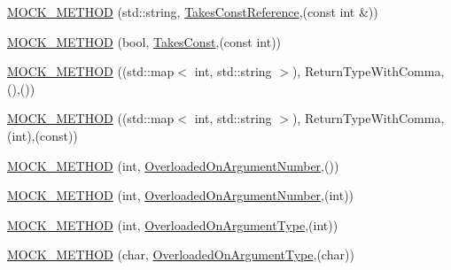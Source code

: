 \begin{DoxyCompactItemize}
\mbox{\hyperlink{classtesting_1_1gmock__function__mocker__test_1_1_mock_foo_a8449bdfea3eaf9fabb34fa694c17ab25}{M\+O\+C\+K\+\_\+\+M\+E\+T\+H\+OD}} (std\+::string, \mbox{\hyperlink{classtesting_1_1gmock__function__mocker__test_1_1_foo_interface_a4765c543c11b5d544a35f9fe8de758bd}{Takes\+Const\+Reference}},(const int \&))
\item 
\mbox{\hyperlink{classtesting_1_1gmock__function__mocker__test_1_1_mock_foo_a68193fcc8b336763c92cb1c8fd7a97ea}{M\+O\+C\+K\+\_\+\+M\+E\+T\+H\+OD}} (bool, \mbox{\hyperlink{classtesting_1_1gmock__function__mocker__test_1_1_foo_interface_abb43737fd2eeb7599b6f0af540890f50}{Takes\+Const}},(const int))
\item 
\mbox{\hyperlink{classtesting_1_1gmock__function__mocker__test_1_1_mock_foo_a8fdcae66e6f4efa07a57580235ca3323}{M\+O\+C\+K\+\_\+\+M\+E\+T\+H\+OD}} ((std\+::map$<$ int, std\+::string $>$), Return\+Type\+With\+Comma,(),())
\item 
\mbox{\hyperlink{classtesting_1_1gmock__function__mocker__test_1_1_mock_foo_adfb6a040264fc42059f0b47e3f21e2df}{M\+O\+C\+K\+\_\+\+M\+E\+T\+H\+OD}} ((std\+::map$<$ int, std\+::string $>$), Return\+Type\+With\+Comma,(int),(const))
\item 
\mbox{\hyperlink{classtesting_1_1gmock__function__mocker__test_1_1_mock_foo_ae7564f6d942087d67512b521fb355f94}{M\+O\+C\+K\+\_\+\+M\+E\+T\+H\+OD}} (int, \mbox{\hyperlink{classtesting_1_1gmock__function__mocker__test_1_1_foo_interface_ae27d00da9698493b196d0913dd5b6c1a}{Overloaded\+On\+Argument\+Number}},())
\item 
\mbox{\hyperlink{classtesting_1_1gmock__function__mocker__test_1_1_mock_foo_ab859902d52f376112fa8c8d5ca402d8a}{M\+O\+C\+K\+\_\+\+M\+E\+T\+H\+OD}} (int, \mbox{\hyperlink{classtesting_1_1gmock__function__mocker__test_1_1_foo_interface_ae27d00da9698493b196d0913dd5b6c1a}{Overloaded\+On\+Argument\+Number}},(int))
\item 
\mbox{\hyperlink{classtesting_1_1gmock__function__mocker__test_1_1_mock_foo_a6c4bc14602957c662e9ace719cf0fd96}{M\+O\+C\+K\+\_\+\+M\+E\+T\+H\+OD}} (int, \mbox{\hyperlink{classtesting_1_1gmock__function__mocker__test_1_1_foo_interface_a78fc84ae56ba53a36047f0791d03fc58}{Overloaded\+On\+Argument\+Type}},(int))
\item 
\mbox{\hyperlink{classtesting_1_1gmock__function__mocker__test_1_1_mock_foo_ae7680c58ebcf5f91c5f190043528b313}{M\+O\+C\+K\+\_\+\+M\+E\+T\+H\+OD}} (char, \mbox{\hyperlink{classtesting_1_1gmock__function__mocker__test_1_1_foo_interface_a78fc84ae56ba53a36047f0791d03fc58}{Overloaded\+On\+Argument\+Type}},(char))

\end{DoxyCompactItemize}
